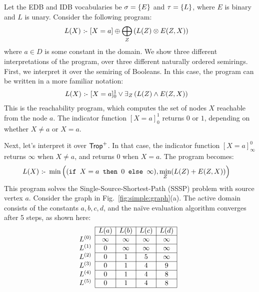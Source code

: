 \begin{ex} \label{ex:reachability:sssp} Let the EDB and IDB
  vocabularies be $\sigma = \{E\}$ and $\tau = \{L\}$, where $E$
  is binary and $L$ is unary.  Consider the following \datalogo program:
  \begin{align}
    L(X) \text{ :- } & [X=a] \oplus \bigoplus_Z \left(L(Z) \otimes E(Z,X)\right) \label{eq:reachability}
  \end{align}
  where $a \in D$ is some constant in the domain.  We show three
  different interpretations of the program, over three different
  naturally ordered semirings.  First, we interpret it over the
  semiring of Booleans.  In this case, the program can be written in a
  more familiar notation:
  \begin{align*}
    L(X) \text{ :- } & [X=a]_0^1 \vee \exists_Z \left(L(Z) \wedge E(Z,X)\right)
  \end{align*}
  This is the reachability program, which computes the set of nodes
  $X$ reachable from the node $a$.  The indicator function $[X=a]_0^1$
  returns $0$ or $1$, depending on whether $X\neq a$ or $X=a$.

  Next, let's interpret it over $\text{\sf Trop}^+$.  In that case, the
  indicator function $[X=a]_\infty^0$ returns $\infty$ when $X\neq a$,
  and returns $0$ when $X=a$.  The program becomes:
  \begin{align*}
    L(X) \text{ :- }  & \min\left((\texttt{if } X=a\texttt{ then } 0 \texttt{ else } \infty),  \min_Z(L(Z) + E(Z,X))\right)
  \end{align*}
  This program solves the Single-Source-Shortest-Path (SSSP) problem with source
  vertex $a$.
  Consider the graph in Fig.~\ref{fig:simple:graph}(a).  The active
  domain consists of the constants $a,b,c,d$, and the na\"ive evaluation
  algorithm converges after 5 steps, as shown here:
  \begin{align*}
      &
        \begin{array}{l|c|c|c|c|} \cline{2-5}
          &L(a)&L(b)&L(c)&L(d) \\ \cline{2-5}
          L^{(0)} & \infty & \infty & \infty & \infty  \\ \cline{2-5}
          L^{(1)} & 0 & \infty & \infty & \infty  \\ \cline{2-5}
          L^{(2)} & 0 & 1 & 5 & \infty  \\ \cline{2-5}
          L^{(3)} & 0 & 1 & 4 & 9  \\ \cline{2-5}
          L^{(4)} & 0 & 1 & 4 & 8  \\ \cline{2-5}
          L^{(5)} & 0 & 1 & 4 & 8  \\ \cline{2-5}
        \end{array}
  \end{align*}


\end{ex}
